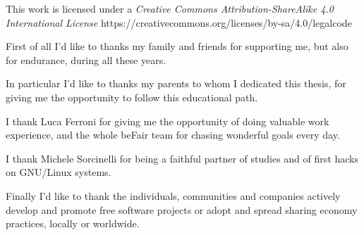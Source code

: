 \documentclass[a4paper,twoside,11pt]{report}
\begin{document}

\copertinatesi
{}
\indice
\indicefigure
\indicetabelle
\iniziatesto

This work is licensed under a \textit{Creative Commons Attribution-ShareAlike 4.0 International License} https://creativecommons.org/licenses/by-sa/4.0/legalcode









\appendix




\ringraziamenti
First of all I'd like to thanks my family and friends for supporting me, but also for endurance, during all these years.

In particular I'd like to thanks my parents to whom I dedicated this thesis, for giving me the opportunity to follow this educational path.

I thank Luca Ferroni for giving me the opportunity of doing valuable work experience, and the whole beFair team for chasing wonderful goals every day.

I thank Michele Sorcinelli for being a faithful partner of studies and of first hacks on GNU/Linux systems.

Finally I'd like to thank the individuals, communities and companies actively develop and promote free software projects or adopt and spread sharing economy practices, locally or worldwide.
\end{document}
